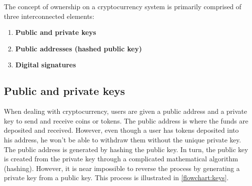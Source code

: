 The concept of ownership on a cryptocurrency system is primarily comprised of three interconnected elements:

\begin{enumerate}
\setlength\itemsep{0em}
    \item \textbf{Public and private keys}
    \item \textbf{Public addresses (hashed public key)}
    \item \textbf{Digital signatures} 
\end{enumerate}

\subsection{Public and private keys}
When dealing with cryptocurrency, users are given a public address and a private key to send and receive coins or tokens. The public address is where the funds are deposited and received. However, even though a user has tokens deposited into his address, he won't be able to withdraw them without the unique private key. The public address is generated by hashing the public key. In turn, the public key is created from the private key through a complicated mathematical algorithm (hashing). However, it is near impossible to reverse the process by generating a private key from a public key. This process is illustrated in \cref{flowchart:keys}.\medskip


        


